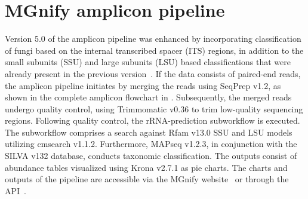 \section{MGnify amplicon pipeline}\label{sec:MGnify}
Version 5.0 of the amplicon pipeline was enhanced by incorporating classification of fungi based on the internal transcribed spacer (ITS) regions, in addition to the small subunits (SSU) and large subunits (LSU) based classifications that were already present in the previous version~\cite{mitchell_mgnify_2020}. If the data consists of paired-end reads, the amplicon pipeline initiates by merging the reads using SeqPrep v1.2, as shown in the complete amplicon flowchart in . Subsequently, the merged reads undergo quality control, using Trimmomatic v0.36 to trim low-quality sequencing regions. Following quality control, the rRNA-prediction subworkflow is executed. The subworkflow comprises a search against Rfam v13.0 SSU and LSU models utilizing cmsearch v1.1.2. Furthermore, MAPseq v1.2.3, in conjunction with the SILVA v132 database, conducts taxonomic classification. The outputs consist of abundance tables visualized using Krona v2.7.1 as pie charts. The charts and outputs of the pipeline are accessible via the MGnify website~\cite{noauthor_mgnify_nodate-23} or through the API~\cite{mitchell_mgnify_2020}.

